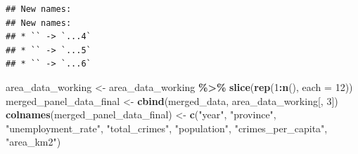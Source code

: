 \documentclass[
]{article}
\newenvironment{Shaded}{\begin{snugshade}}{\end{snugshade}}
\newcommand{\AttributeTok}[1]{\textcolor[rgb]{0.13,0.29,0.53}{#1}}
\newcommand{\DecValTok}[1]{\textcolor[rgb]{0.00,0.00,0.81}{#1}}
\newcommand{\FunctionTok}[1]{\textcolor[rgb]{0.13,0.29,0.53}{\textbf{#1}}}
\newcommand{\NormalTok}[1]{#1}
\newcommand{\OtherTok}[1]{\textcolor[rgb]{0.56,0.35,0.01}{#1}}
\newcommand{\SpecialCharTok}[1]{\textcolor[rgb]{0.81,0.36,0.00}{\textbf{#1}}}
\newcommand{\StringTok}[1]{\textcolor[rgb]{0.31,0.60,0.02}{#1}}
\begin{document}
\begin{verbatim}
## New names:
## New names:
## * `` -> `...4`
## * `` -> `...5`
## * `` -> `...6`
\end{verbatim}

\begin{Shaded}
\begin{Highlighting}[]
\NormalTok{area\_data\_working }\OtherTok{\textless{}{-}}\NormalTok{ area\_data\_working }\SpecialCharTok{\%\textgreater{}\%}
  \FunctionTok{slice}\NormalTok{(}\FunctionTok{rep}\NormalTok{(}\DecValTok{1}\SpecialCharTok{:}\FunctionTok{n}\NormalTok{(), }\AttributeTok{each =} \DecValTok{12}\NormalTok{))}
\NormalTok{merged\_panel\_data\_final }\OtherTok{\textless{}{-}} \FunctionTok{cbind}\NormalTok{(merged\_data, area\_data\_working[, }\DecValTok{3}\NormalTok{])}
\FunctionTok{colnames}\NormalTok{(merged\_panel\_data\_final) }\OtherTok{\textless{}{-}} \FunctionTok{c}\NormalTok{(}\StringTok{"year"}\NormalTok{, }\StringTok{"province"}\NormalTok{, }\StringTok{"unemployment\_rate"}\NormalTok{,}
                                       \StringTok{"total\_crimes"}\NormalTok{, }\StringTok{"population"}\NormalTok{, }\StringTok{"crimes\_per\_capita"}\NormalTok{, }\StringTok{"area\_km2"}\NormalTok{)}
\end{Highlighting}
\end{Shaded}
\end{document}
